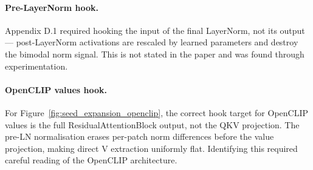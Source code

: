\paragraph{Pre-LayerNorm hook.} Appendix D.1 required hooking the input of the final LayerNorm, not its output — post-LayerNorm activations are rescaled by learned parameters and destroy the bimodal norm signal. This is not stated in the paper and was found through experimentation.
\paragraph{OpenCLIP values hook.} For Figure~\ref{fig:seed_expansion_openclip}, the correct hook target for OpenCLIP values is the full ResidualAttentionBlock output, not the QKV projection. The pre-LN normalisation erases per-patch norm differences before the value projection, making direct V extraction uniformly flat. Identifying this required careful reading of the OpenCLIP architecture.